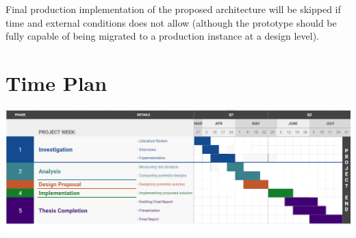 \documentclass[12pt]{article}
\begin{document}
\noindent Final production implementation of the proposed architecture will be skipped if time and external conditions does not allow (although the prototype should be fully capable of being migrated to a production instance at a design level). 

\section{Time Plan}
   \begin{center}
        \includegraphics[scale=0.65]{Images/timeline.png}
   \end{center}



\end{document}
